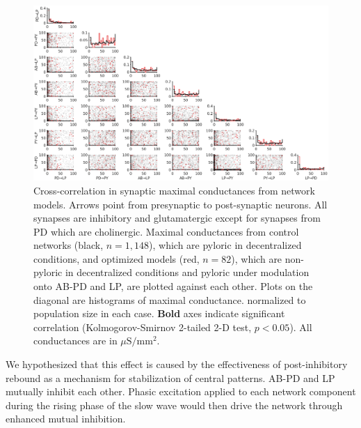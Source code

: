 \begin{figure}
	\centering
	\includegraphics[width=1.3\linewidth]{gfx/all-modulation/correlations_synapses}
	\caption[Cross-correlations in synaptic maximal conductances]{Cross-correlation in synaptic maximal conductances from network models. Arrows point from presynaptic to post-synaptic neurons. All synapses are inhibitory and glutamatergic except for synapses from \acs{PD} which are cholinergic. Maximal conductances from control networks (black, $n=1,148$), which are pyloric in decentralized conditions, and optimized models (red, $n=82$), which are non-pyloric in decentralized conditions and pyloric under modulation onto \acs{AB}-\acs{PD} and \acs{LP}, are plotted against each other. Plots on the diagonal are histograms of maximal conductance. normalized to population size in each case. \textbf{Bold} axes indicate significant correlation (Kolmogorov-Smirnov 2-tailed 2-D test, $p<0.05$). All conductances are in $\mu\mathrm{S/mm^2}.$} 
	\label{fig:correlationssynapses}
\end{figure}


We hypothesized that this effect is caused by the effectiveness of post-inhibitory rebound as a mechanism for stabilization of central patterns. \acs{AB}-\acs{PD} and \acs{LP} mutually inhibit each other. Phasic excitation applied to each network component during the rising phase of the slow wave would then drive the network through enhanced mutual inhibition.


